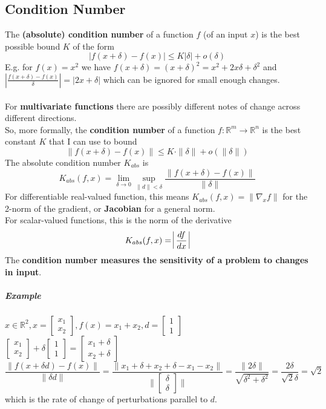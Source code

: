 \documentclass[10pt]{report}
\begin{document}
\subsection{Condition Number}
The \textbf{(absolute) condition number} of a function $f$ (of an input $x$) is the best possible bound $K$ of the form
$$|f(x+\delta)-f(x)|\leq K|\delta| + o(\delta)$$ 
E.g. for $f(x)=x^2$ we have $f(x+\delta)=(x+\delta)^2 = x^2+2x\delta+\delta^2$ and $|\frac{f(x+\delta)-f(x)}{\delta}|=|2x+\delta|$ which can be ignored for small enough changes.\\\\
For \textbf{multivariate functions} there are possibly different notes of change across different directions.\\
So, more formally, the \textbf{condition number} of a function $f:\mathbb{R}^m\rightarrow \mathbb{R}^n$ is the best constant $K$ that I can use to bound $$\|f(x+\delta)-f(x)\| \leq K\cdot\|\delta\| + o(\|\delta\|)$$
The absolute condition number $K_{abs}$ is $$K_{abs}(f,x) = \lim_{\delta\to 0}\sup_{\|d\|<\delta}\frac{\|f(x+\delta) - f(x)\|}{\|\delta\|}$$ For differentiable real-valued function, this means $K_{abs}(f,x) = \|\nabla_x f\|$ for the 2-norm of the gradient, or \textbf{Jacobian} for a general norm.\\
For scalar-valued functions, this is the norm of the derivative $$K_{abs}(f,x) = \:\vline\frac{df}{dx}\:\vline$$
The \textbf{condition number measures the sensitivity of a problem to changes in input}.
\subparagraph{Example} $x\in \mathbb{R}^2, x=\left[\begin{array}{c}
x_1\\x_2
\end{array}\right], f(x) = x_1 + x_2, d = \left[\begin{array}{c}
1\\1
\end{array}\right]$\\
$\left[\begin{array}{c}
x_1\\x_2
\end{array}\right] + \delta\left[\begin{array}{c}
1\\1
\end{array}\right] = \left[\begin{array}{c}
x_1+\delta\\x_2+\delta
\end{array}\right]$
$$\frac{\|f(x+\delta d) - f(x)\|}{\|\delta d\|} = \frac{\|x_1+\delta+x_2+\delta-x_1-x_2\|}{\| \left[\begin{array}{c}
\delta\\\delta
\end{array}\right]\|} = \frac{\|2\delta\|}{\sqrt{\delta^2 + \delta^2}} = \frac{2\delta}{\sqrt{2}\delta} = \sqrt{2}$$ which is the rate of change of perturbations parallel to $d$.\\
\end{document}
